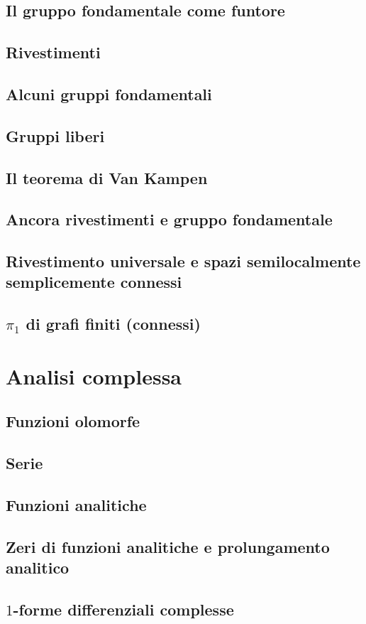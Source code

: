 \documentclass{article}
\begin{document}
\subsection{Il gruppo fondamentale come funtore}


\subsection{Rivestimenti}


\subsection{Alcuni gruppi fondamentali}


\subsection{Gruppi liberi}


\subsection{Il teorema di Van Kampen}


\subsection{Ancora rivestimenti e gruppo fondamentale}


\subsection{Rivestimento universale e spazi semilocalmente semplicemente connessi}


\subsection{$\pi_1$ di grafi finiti (connessi)}


\section{Analisi complessa}

\subsection{Funzioni olomorfe}


\subsection{Serie}


\subsection{Funzioni analitiche}


\subsection{Zeri di funzioni analitiche e prolungamento analitico}


\subsection{$1$-forme differenziali complesse}

\end{document}
